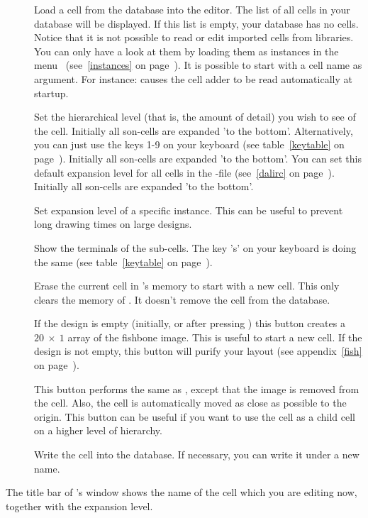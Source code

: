 \begin{description}
\item []
Load a cell from the database into the editor. The list of all cells
in your database will be displayed. If this list is empty, your
database has no cells. Notice that it is not possible to read or
edit imported cells from libraries. You can only have a look
at them by loading them as instances in the menu~
(see~\ref{instances} on page~\pageref{instances}).
It is possible to start  with a cell name as argument.
For instance:  causes the cell adder
to be read automatically at startup.
\item []
Set the hierarchical level (that is, the amount of detail) you wish to see of
the cell. Initially all son-cells are expanded 'to the bottom'.  Alternatively,
you can just use the keys 1-9 on your keyboard (see table~\ref{keytable} on
page~\pageref{keytable}).  Initially all son-cells are expanded 'to the
bottom'. You can set this default expansion level for all cells in the
-file (see~\ref{dalirc} on page~\pageref{dalirc}).  Initially all
son-cells are expanded 'to the bottom'.
\item []
Set expansion level of a specific instance.
This can be useful to prevent long drawing times on large designs.
\item[]
Show the terminals of the sub-cells. The key 's' on your keyboard is doing the
same (see table~\ref{keytable} on page~\pageref{keytable}).
\item[]
Erase the current cell in 's memory to start with a new cell. 
This only clears the memory of . It doesn't remove the cell
from the database.
\item[]
If the design is empty (initially, or after pressing ) this button
creates a $20~\times~1$ array of the fishbone image.  This is useful to start a
new cell. If the design is not empty, this button will purify your layout (see
appendix~\ref{fish} on page~\pageref{fish}).
\item[]
This button performs the same as , except that the image
is removed from the cell. Also, the cell is automatically moved as close as
possible to the origin. This button can be useful if you want to use the cell
as a child cell on a higher level of hierarchy.
\item[]
Write the cell into the database. If necessary, you can write it under 
a new name.
\end{description}
The title bar of 's window shows the name of the cell
which you are editing now, together with the expansion level.

